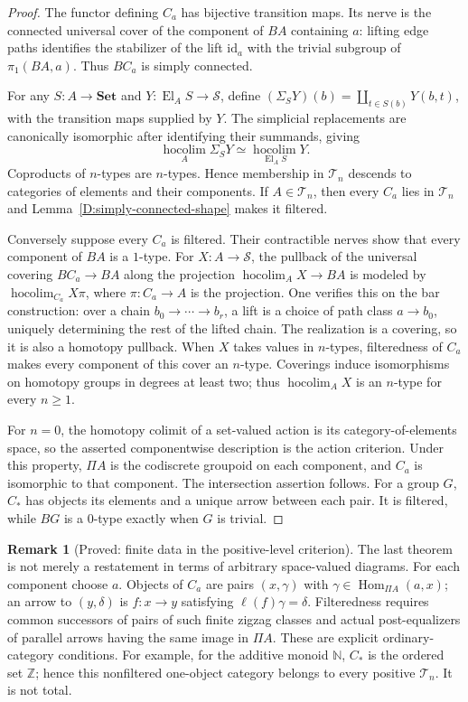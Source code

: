 \documentclass[11pt,a4paper]{article}
\newcommand{\Set}{\mathbf{Set}}
\newcommand{\El}{\operatorname{El}}
\newcommand{\hocolim}{\operatorname*{hocolim}}
\newcommand{\id}{\mathrm{id}}
\newcommand{\Hom}{\operatorname{Hom}}
\newcommand{\Space}{\mathcal S}
\theoremstyle{definition}
\newtheorem{remark}[theorem]{Remark}
\begin{document}
\begin{proof}
The functor defining $C_a$ has bijective transition maps.
Its nerve is the connected universal cover of the component of
$BA$ containing $a$: lifting edge paths identifies the stabilizer
of the lift $\id_a$ with the trivial subgroup of
$\pi_1(BA,a)$. Thus $BC_a$ is simply connected.

For any $S:A\to\Set$ and $Y:\El_A S\to\Space$, define
$(\Sigma_S Y)(b)=\coprod_{t\in S(b)}Y(b,t)$, with the transition
maps supplied by $Y$. The simplicial replacements are canonically
isomorphic after identifying their summands, giving
\[
\hocolim_A\Sigma_S Y\simeq\hocolim_{\El_A S}Y.
\]
Coproducts of $n$-types are $n$-types. Hence membership in
$\mathcal T_n$ descends to categories of elements and their
components. If $A\in\mathcal T_n$, then every $C_a$ lies in
$\mathcal T_n$ and Lemma~\ref{D:simply-connected-shape} makes
it filtered.

Conversely suppose every $C_a$ is filtered. Their contractible
nerves show that every component of $BA$ is a $1$-type.
For $X:A\to\Space$, the pullback of the universal covering
$BC_a\to BA$ along the projection $\hocolim_A X\to BA$ is
modeled by $\hocolim_{C_a}X\pi$, where $\pi:C_a\to A$ is the
projection. One verifies this on the bar construction: over a
chain $b_0\to\cdots\to b_r$, a lift is a choice of path class
$a\to b_0$, uniquely determining the rest of the lifted chain.
The realization is a covering, so it is also a homotopy pullback.
When $X$ takes values in $n$-types, filteredness of $C_a$ makes
every component of this cover an $n$-type. Coverings induce
isomorphisms on homotopy groups in degrees at least two; thus
$\hocolim_A X$ is an $n$-type for every $n\geq1$.

For $n=0$, the homotopy colimit of a set-valued action is its
category-of-elements space, so the asserted componentwise
description is the action criterion. Under this property,
$\Pi A$ is the codiscrete groupoid on each component, and $C_a$
is isomorphic to that component. The intersection assertion
follows. For a group $G$, $C_*$ has objects its elements and a
unique arrow between each pair. It is filtered, while $BG$ is a
$0$-type exactly when $G$ is trivial.
\end{proof}

\begin{remark}[Proved: finite data in the positive-level criterion]\label{D:Tn-finite-data}
The last theorem is not merely a restatement in terms of arbitrary
space-valued diagrams. For each component choose $a$. Objects of
$C_a$ are pairs $(x,\gamma)$ with
$\gamma\in\Hom_{\Pi A}(a,x)$; an arrow to $(y,\delta)$ is
$f:x\to y$ satisfying $\ell(f)\gamma=\delta$. Filteredness
requires common successors of pairs of such finite zigzag classes
and actual post-equalizers of parallel arrows having the same
image in $\Pi A$. These are explicit ordinary-category conditions.
For example, for the additive monoid $\mathbb N$, $C_*$ is the
ordered set $\mathbb Z$; hence this nonfiltered one-object category
belongs to every positive $\mathcal T_n$. It is not total.
\end{remark}
\end{document}
